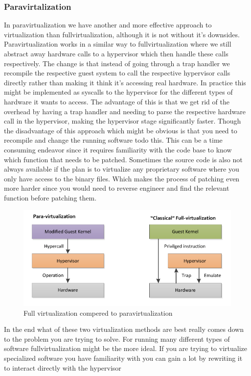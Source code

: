\subsubsection{Paravirtalization}
\label{theory:paravirtualization}

In paravirtualization we have another and more effective approach to virtualization than fullvirtualization, although it is not without it’s downsides. Paravirtualization works in a similar way to fullvirtualization where we still abstract away hardware calls to a hypervisor which then handle these calls respectively. The change is that instead of going through a trap handler we recompile the respective guest system to call the respective hypervisor calls directly rather than making it think it’s accessing real hardware. In practice this might be implemented as syscalls to the hypervisor for the different types of hardware it wants to access. The advantage of this is that we get rid of the overhead by having a trap handler and needing to parse the respective hardware call in the hypervisor, making the hypervisor stage significantly faster. Though the disadvantage of this approach which might be obvious is that you need to recompile and change the running software todo this. This can be a time consuming endeavor since it requires familiarity with the code base to know which function that needs to be patched. Sometimes the source code is also not always available if the plan is to virtualize any proprietary software where you only have access to the binary files. Which makes the process of patching even more harder since you would need to reverse engineer and find the relevant function before patching them.

\begin{figure}[htbp]
    \centering
    \includegraphics[width=\textwidth]{Images/Virtualization_-_Para_vs_Full.png}
    \caption{Full virtualization compered to paravirtualization}

    \label{fig:vir-para-vs-full}
\end{figure}

In the end what of these two virtualization methods are best really comes down to the problem you are trying to solve. For running many different types of software fullvirtualization might be the more ideal. If you are trying to virtualize specialized software you have familiarity with you can gain a lot by rewriting it to interact directly with the hypervisor

